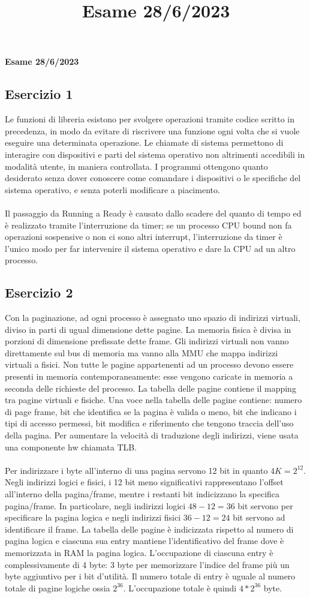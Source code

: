 \documentclass[12pt]{article}
\title{Esame 28/6/2023}
\begin{document}
\begin{center}
    \large\textbf{Esame 28/6/2023}
\end{center}
\subsection*{Esercizio 1}
Le funzioni di libreria esistono per svolgere operazioni tramite codice scritto in precedenza, in modo da evitare di 
riscrivere una funzione ogni volta che si vuole eseguire una determinata operazione. Le chiamate di sistema permettono di 
interagire con dispositivi e parti del sistema operativo non altrimenti accedibili in modalità utente, in maniera controllata. 
I programmi ottengono quanto desiderato senza dover conoscere come comandare i dispositivi o le specifiche del sistema 
operativo, e senza poterli modificare a piacimento.\\\\
Il passaggio da Running a Ready è causato dallo scadere del quanto di tempo ed è realizzato tramite l'interruzione da timer; 
se un processo CPU bound non fa operazioni sospensive o non ci sono altri interrupt, l'interruzione da timer è l'unico 
modo per far intervenire il sistema operativo e dare la CPU ad un altro processo.
\subsection*{Esercizio 2}
Con la paginazione, ad ogni processo è assegnato uno spazio di indirizzi virtuali, diviso in parti di ugual dimensione dette 
pagine. La memoria fisica è divisa in porzioni di dimensione prefissate dette frame. 
Gli indirizzi virtuali non vanno direttamente sul bus di memoria ma vanno alla MMU che mappa indirizzi virtuali a fisici. 
Non tutte le pagine appartenenti ad un processo devono essere presenti in memoria contemporaneamente: esse vengono caricate 
in memoria a seconda delle richieste del processo. La tabella delle pagine contiene il mapping tra pagine virtuali e fisiche.
Una voce nella tabella delle pagine contiene: numero di page frame, bit che identifica se la pagina è valida o meno, bit 
che indicano i tipi di accesso permessi, bit modifica e riferimento che tengono traccia dell'uso della pagina. Per aumentare 
la velocità di traduzione degli indirizzi, viene usata una componente hw chiamata TLB.\\\\
Per indirizzare i byte all'interno di una pagina servono 12 bit in quanto $4K=2^{12}$. Negli indirizzi logici e fisici, 
i 12 bit meno significativi rappresentano l'offset all'interno della pagina/frame, mentre i restanti bit indicizzano la 
specifica pagina/frame. In particolare, negli indirizzi logici $48-12=36$ bit servono per specificare la pagina logica e 
negli indirizzi fisici $36-12=24$ bit servono ad identificare il frame. La tabella delle pagine è indicizzata rispetto al 
numero di pagina logica e ciascuna sua entry mantiene l'identificativo del frame dove è memorizzata in RAM la pagina logica.
L'occupazione di ciascuna entry è complessivamente di 4 byte: 3 byte per memorizzare l'indice del frame più un byte aggiuntivo 
per i bit d'utilità. Il numero totale di entry è uguale al numero totale di pagine logiche ossia $2^{36}$. L'occupazione 
totale è quindi $4*2^{36}$ byte.
\subsection{}
\end{document}
